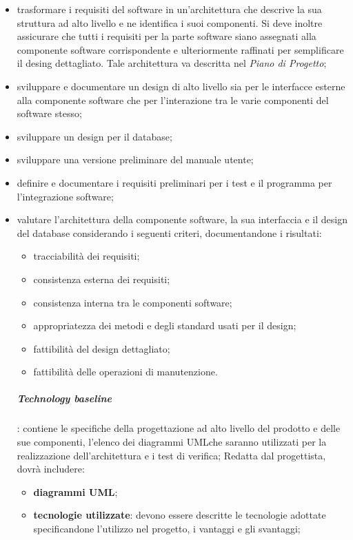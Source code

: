 			\begin{itemize}
			\item trasformare i requisiti del software in un'architettura che descrive la sua struttura ad alto livello e ne identifica i suoi componenti. Si deve inoltre assicurare che tutti i requisiti per la parte software siano assegnati alla componente software corrispondente e ulteriormente raffinati per semplificare il desing dettagliato. Tale architettura va descritta nel \textit{Piano di Progetto};
			\item sviluppare e documentare un design di alto livello sia per le interfacce esterne alla componente software che per l'interazione tra le varie componenti del software stesso;
			\item sviluppare un design per il database;
			\item sviluppare una versione preliminare del manuale utente;
			\item definire e documentare i requisiti preliminari per i test e il programma per l'integrazione software;
			\item valutare l'architettura della componente software, la sua interfaccia e il design del database considerando i seguenti criteri, documentandone i risultati:
			\begin{itemize}
			\item tracciabilità dei requisiti;
			\item consistenza esterna dei requisiti;
			\item consistenza interna tra le componenti software;
			\item appropriatezza dei metodi e degli standard usati per il design;
			\item fattibilità del design dettagliato;
			\item fattibilità delle operazioni di manutenzione.
			\end{itemize}
			\subparagraph{Technology baseline}: contiene le specifiche della progettazione ad alto livello del prodotto e delle sue componenti, l'elenco dei diagrammi UML\glosp che saranno utilizzati per la realizzazione dell'architettura e i test di verifica;\newline \newline
			Redatta dal progettista, dovrà includere:
			\begin{itemize}
				\item \textbf{diagrammi UML\glo};
				\item \textbf{tecnologie utilizzate}: devono essere descritte le tecnologie adottate specificandone l'utilizzo nel progetto, i vantaggi e gli svantaggi;

\end{itemize}
\end{itemize}
